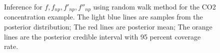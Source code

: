 \documentclass{article}
\begin{document}
\begin{figure}[p]
    \centering
    \caption{Inference for $f, f_{np}, f'_{np},f''_{np}$ using random walk method for the CO2 concentration example. The light blue lines are samples from the posterior distribution; The red lines are posterior mean; The orange lines are the posterior credible interval with 95 percent coverage rate.}
    \label{fig:CO2_RW2}
\end{figure}
\end{document}
